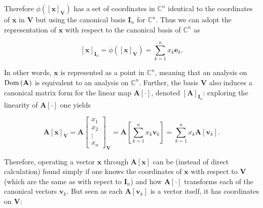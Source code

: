 	Therefore $\phi\left(\left[\mathbf{x}\right]_{\mathbf{V}}\right)$ has a set of coordinates in $\mathbb{C}^n$ identical to the coordinates of $\mathbf{x}$ in $\mathbf{V}$ but using the canonical basis $\mathbf{I}_n$ for $\mathbb{C}^n$. Thus we can adopt the representation of $\mathbf{x}$ with respect to the canonical basis of $\mathbb{C}^n$ as

\begin{equation} \left[\mathbf{x}\right]_{\mathbf{I}_n} = \phi\left(\left[\mathbf{x}\right]_{\mathbf{V}}\right) = \sum\limits_{k=1}^n x_k \mathbf{e}_k .\end{equation}

	In other words, $\mathbf{x}$ is represented as a point in $\mathbb{C}^n$, meaning that an analysis on $\operatorname{Dom}\left(\mathbf{A}\right)$ is equivalent to an analysis on $\mathbb{C}^n$. Further, the basis $\mathbf{V}$ also induces a canonical matrix form for the linear map $\mathbf{A}\left[\cdot\right]$, denoted $\left[\mathbf{A}\right]_{\mathbf{I}_n}$: exploring the linearity of $\mathbf{A}\left[\cdot\right]$ one yields

\begin{equation}
	\mathbf{A}\left[\mathbf{x}\right]_{\mathbf{V}} = \mathbf{A}\left[\begin{array}{c} x_1 \\[3mm] x_2 \\[3mm] \vdots \\[3mm] x_n\end{array} \right]_\mathbf{V} = \mathbf{A}\left[\sum\limits_{k=1}^n x_k\mathbf{v}_k \right] = \sum_{k=1}^n x_k\mathbf{A}\left[\mathbf{v}_k\right] \label{eq:Aappliedtox} .%
\end{equation}

	Therefore, operating a vector $\mathbf{x}$ through $\mathbf{A}\left[\mathbf{x}\right]$ can be (instead of direct calculation) found simply if one knows the coordinates of $\mathbf{x}$ with respect to $\mathbf{V}$ (which are the same as with repect to $\mathbf{I}_n$) and how $\mathbf{A}\left[\cdot\right]$ transforms each of the canonical vectors $\mathbf{v}_k$. But seen as each $\mathbf{A}\left[\mathbf{v}_k\right]$ is a vector itself, it has coordinates on $\mathbf{V}$:

